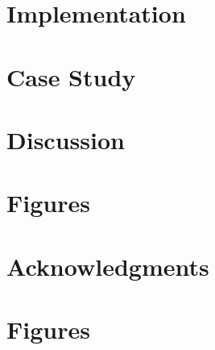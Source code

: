 \documentclass{frontiersSCNS} %
\begin{document}
\section{Implementation}

\section{Case Study}

\section{Discussion}

\section{Figures}

\section*{Acknowledgments}





\section*{Figures}

\end{document}
